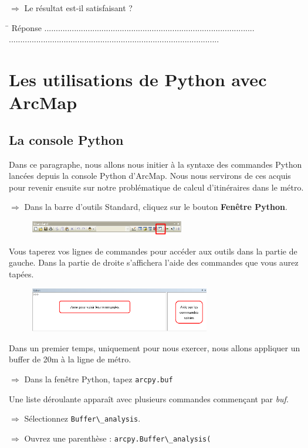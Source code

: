 \documentclass[11pt]{article}
\newcommand{\action}{$\Rightarrow$ }
\newcommand{\reponse}{
	\begin{tabbing}
	\hspace{2cm}\=\kill
	Réponse \> ............................................................................................ \\
 	\> ............................................................................................
	\end{tabbing}
}
\newcommand{\code}[1]{\lstinline{#1}}
\begin{document}
\action Le résultat est-il satisfaisant ?

\reponse



\section{Les utilisations de Python avec ArcMap}

\subsection{La console Python}
Dans ce paragraphe, nous allons nous initier à la syntaxe des commandes Python lancées depuis la console Python d'ArcMap. Nous nous servirons de ces acquis pour revenir ensuite sur notre problématique de calcul d'itinéraires dans le métro.

\action Dans la barre d'outils Standard, cliquez sur le bouton \textbf{Fenêtre Python}.
\begin{figure}[H]
	\center \includegraphics[width=0.6\textwidth]{img/td3/python_bouton.png}\\
\end{figure}

Vous taperez vos lignes de commandes pour accéder aux outils dans la partie de gauche. Dans la partie de droite s'affichera l'aide des commandes que vous aurez tapées.
\begin{figure}[H]
	\center \includegraphics[width=0.7\textwidth]{img/td3/python_console.png}\\
\end{figure}

Dans un premier temps, uniquement pour nous exercer, nous allons appliquer un buffer de 20m à la ligne de métro.

\action Dans la fenêtre Python, tapez \code{arcpy.buf}

Une liste déroulante apparaît avec plusieurs commandes commençant par \textit{buf}.

\action Sélectionnez \code{Buffer\_analysis}.

\action Ouvrez une parenthèse : \code{arcpy.Buffer\_analysis(}
\end{document}
